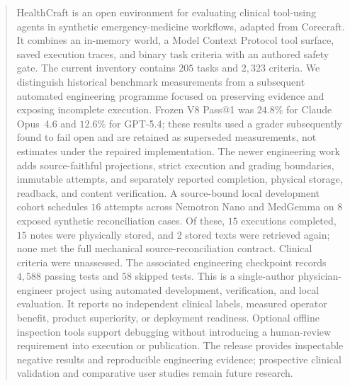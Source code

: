 
\begin{abstract}
HealthCraft is an open environment for evaluating clinical tool-using agents
in synthetic emergency-medicine workflows, adapted from Corecraft. It
combines an in-memory world, a Model Context Protocol tool surface, saved
execution traces, and binary task criteria with an authored safety gate.
The current inventory contains $205$ tasks %
and $2{,}323$ criteria. %
We distinguish historical benchmark measurements from a subsequent automated
engineering programme focused on preserving evidence and exposing incomplete
execution. Frozen V8 Pass@1 was $24.8\%$ for Claude Opus~4.6 %
and $12.6\%$ for GPT-5.4; %
these results used a grader subsequently found to fail open and are retained
as superseded measurements, not estimates under the repaired implementation.
The newer engineering work adds source-faithful projections, strict execution
and grading boundaries, immutable attempts, and separately reported completion,
physical storage, readback, and content verification. A source-bound local
development cohort schedules $16$ attempts %
across Nemotron Nano and MedGemma on $8$ exposed synthetic reconciliation cases. %
Of these, $15$ executions completed, %
$15$ notes were physically stored, %
and $2$ stored texts were retrieved again; %
none met the full mechanical source-reconciliation contract. %
Clinical criteria were unassessed. The associated engineering checkpoint
records $4{,}588$ passing tests %
and $58$ skipped tests. %
This is a single-author physician-engineer project using automated development,
verification, and local evaluation. It reports no independent clinical labels,
measured operator benefit, product superiority, or deployment readiness.
Optional offline inspection tools support debugging without introducing a
human-review requirement into execution or publication. The release provides
inspectable negative results and reproducible engineering evidence; prospective
clinical validation and comparative user studies remain future research.
\end{abstract}

